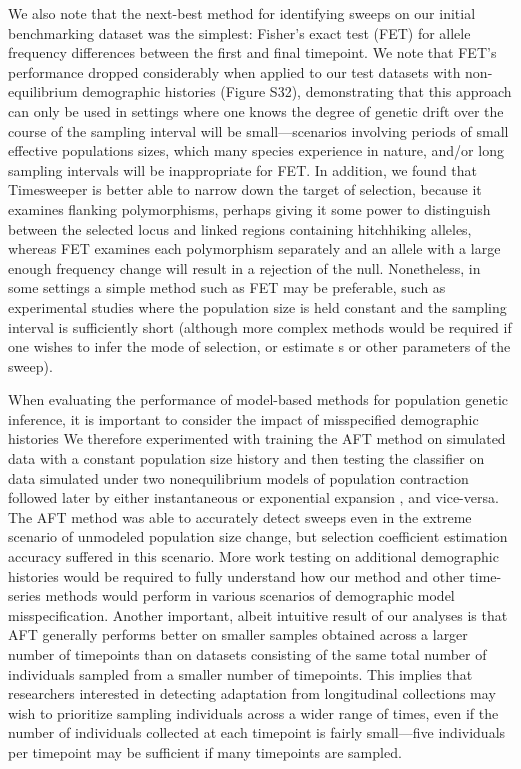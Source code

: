 We also note that the next-best method for identifying sweeps on our initial benchmarking dataset was the simplest: Fisher’s exact test (FET) for allele frequency differences between the first and final timepoint. We note that FET’s performance dropped considerably when applied to our test datasets with non-equilibrium demographic histories (Figure S32), demonstrating that this approach can only be used in settings where one knows the degree of genetic drift over the course of the sampling interval will be small—scenarios involving periods of small effective populations sizes, which many species experience in nature, and/or long sampling intervals will be inappropriate for FET. In addition, we found that Timesweeper is better able to narrow down the target of selection, because it examines flanking polymorphisms, perhaps giving it some power to distinguish between the selected locus and linked regions containing hitchhiking alleles, whereas FET examines each polymorphism separately and an allele with a large enough frequency change will result in a rejection of the null. Nonetheless, in some settings a simple method such as FET may be preferable, such as experimental studies where the population size is held constant and the sampling interval is sufficiently short (although more complex methods would be required if one wishes to infer the mode of selection, or estimate s or other parameters of the sweep).

When evaluating the performance of model-based methods for population genetic inference, it is important to consider the impact of misspecified demographic histories \cite{moDomainadaptiveNeuralNetworks2023a,schriderHICRobustIdentification2016} We therefore experimented with training the AFT method on simulated data with a constant population size history and then testing the classifier on data simulated under two nonequilibrium models of population contraction followed later by either instantaneous or exponential expansion \cite{gutenkunstInferringJointDemographic2009,marthAlleleFrequencySpectrum2004}, and vice-versa. The AFT method was able to accurately detect sweeps even in the extreme scenario of unmodeled population size change, but selection coefficient estimation accuracy suffered in this scenario. More work testing on additional demographic histories would be required to fully understand how our method and other time-series methods would perform in various scenarios of demographic model misspecification. Another important, albeit intuitive result of our analyses is that AFT generally performs better on smaller samples obtained across a larger number of timepoints than on datasets consisting of the same total number of individuals sampled from a smaller number of timepoints. This implies that researchers interested in detecting adaptation from longitudinal collections may wish to prioritize sampling individuals across a wider range of times, even if the number of individuals collected at each timepoint is fairly small—five individuals per timepoint may be sufficient if many timepoints are sampled.

